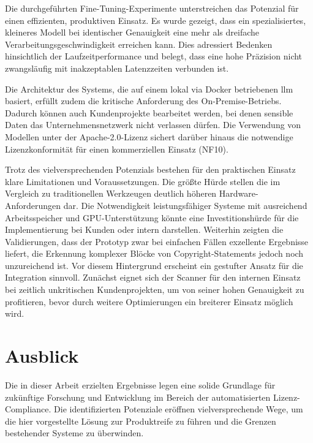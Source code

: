 Die durchgeführten Fine-Tuning-Experimente unterstreichen das Potenzial für einen effizienten, produktiven Einsatz.
Es wurde gezeigt, dass ein spezialisiertes, kleineres Modell bei identischer Genauigkeit eine mehr als dreifache Verarbeitungsgeschwindigkeit erreichen kann.
Dies adressiert Bedenken hinsichtlich der Laufzeitperformance und belegt, dass eine hohe Präzision nicht zwangsläufig mit inakzeptablen Latenzzeiten verbunden ist.

Die Architektur des Systems, die auf einem lokal via Docker betriebenen \gls{llm} basiert, erfüllt zudem die kritische Anforderung des On-Premise-Betriebs.
Dadurch können auch Kundenprojekte bearbeitet werden, bei denen sensible Daten das Unternehmensnetzwerk nicht verlassen dürfen.
Die Verwendung von Modellen unter der Apache-2.0-Lizenz sichert darüber hinaus die notwendige Lizenzkonformität für einen kommerziellen Einsatz (NF10).

Trotz des vielversprechenden Potenzials bestehen für den praktischen Einsatz klare Limitationen und Voraussetzungen.
Die größte Hürde stellen die im Vergleich zu traditionellen Werkzeugen deutlich höheren Hardware-Anforderungen dar.
Die Notwendigkeit leistungsfähiger Systeme mit ausreichend Arbeitsspeicher und GPU-Unterstützung könnte eine Investitionshürde für die Implementierung bei Kunden oder intern darstellen.
Weiterhin zeigten die Validierungen, dass der Prototyp zwar bei einfachen Fällen exzellente Ergebnisse liefert, die Erkennung komplexer Blöcke von Copyright-Statements jedoch noch unzureichend ist.
Vor diesem Hintergrund erscheint ein gestufter Ansatz für die Integration sinnvoll.
Zunächst eignet sich der Scanner für den internen Einsatz bei zeitlich unkritischen Kundenprojekten, um von seiner hohen Genauigkeit zu profitieren, bevor durch weitere Optimierungen ein breiterer Einsatz möglich wird.


\section{Ausblick}

Die in dieser Arbeit erzielten Ergebnisse legen eine solide Grundlage für zukünftige Forschung und Entwicklung im Bereich der automatisierten Lizenz-Compliance.
Die identifizierten Potenziale eröffnen vielversprechende Wege, um die hier vorgestellte Lösung zur Produktreife zu führen und die Grenzen bestehender Systeme zu überwinden.

